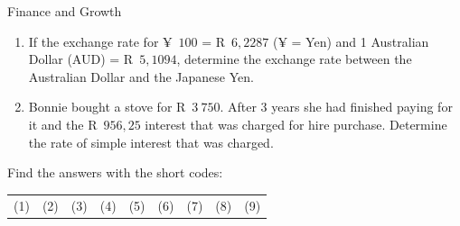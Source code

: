 \begin{eocexercises}{Finance and Growth}
\begin{enumerate}[label=\textbf{\arabic*}.]
	\item If the exchange rate for ¥~$100$ = R~$6,2287$ (¥ = Yen) and 1 Australian Dollar (AUD) = R~$5,1094$, determine the exchange rate between the Australian Dollar and the Japanese Yen.

	\item Bonnie bought a stove for R~$3~750$. After 3 years she had finished paying for it and the R~$956,25$ interest that was charged for hire purchase. Determine the rate of simple interest that was charged.
    \end{enumerate}

    Find the answers with the short codes:\\
    \begin{tabularx}{\textwidth}{ XXXXXXXXX }
	(1) & (2) & (3) & (4) & (5) & (6) & (7) & (8) & (9)\\
    \end{tabularx}
\end{eocexercises}